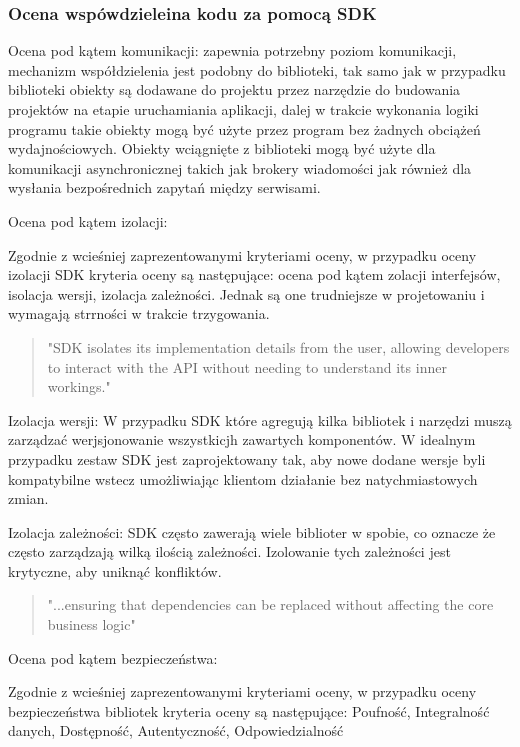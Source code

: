 \documentclass[runningheads,12pt]{llncs}
\begin{document}
\subsubsection{Ocena wspówdzieleina kodu za pomocą SDK}

Ocena pod kątem komunikacji: zapewnia potrzebny poziom komunikacji, mechanizm współdzielenia jest podobny do biblioteki, tak samo jak w przypadku biblioteki obiekty są dodawane do projektu przez narzędzie do budowania projektów na etapie uruchamiania aplikacji, dalej w trakcie wykonania logiki programu takie obiekty mogą być użyte przez program bez żadnych obciążeń wydajnościowych. Obiekty wciągnięte z biblioteki mogą być użyte dla komunikacji asynchronicznej takich jak brokery wiadomości jak również dla wysłania bezpośrednich zapytań między serwisami.

Ocena pod kątem izolacji: 

Zgodnie z wcieśniej zaprezentowanymi kryteriami oceny, w przypadku oceny izolacji SDK kryteria oceny są następujące: ocena pod kątem zolacji interfejsów, isolacja wersji, izolacja zależności. Jednak są one trudniejsze w projetowaniu i wymagają strrności w trakcie trzygowania.

\begin{quote}
    "SDK isolates its implementation details from the user, allowing developers to interact with the API without needing to understand its inner workings." ~\cite[p. 75]{Essential}
\end{quote}

Izolacja wersji: W przypadku SDK które agregują kilka bibliotek i narzędzi muszą zarządzać werjsjonowanie wszystkicjh zawartych komponentów. W idealnym przypadku zestaw SDK jest zaprojektowany tak, aby nowe dodane wersje byli kompatybilne wstecz umożliwiając klientom działanie bez natychmiastowych zmian.

Izolacja zależności: SDK często zawerają wiele biblioter w spobie, co oznacze że często zarządzają wilką ilością zależności. Izolowanie tych zależności jest krytyczne, aby uniknąć konfliktów.

\begin{quote}
    "...ensuring that dependencies can be replaced without affecting the core business logic" ~\cite[p. 218]{martin2008clean}
\end{quote}

Ocena pod kątem bezpieczeństwa: 

Zgodnie z wcieśniej zaprezentowanymi kryteriami oceny, w przypadku oceny bezpieczeństwa bibliotek kryteria oceny są następujące: Poufność, Integralność danych, Dostępność, Autentyczność, Odpowiedzialność
\end{document}
